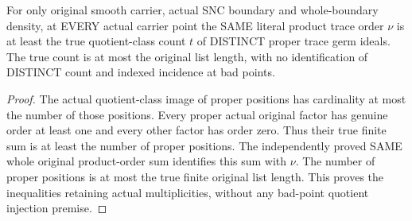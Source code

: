 \begin{theorem}
\label{hir:sharp-original-product-order-ge-distinct-proper-count-all-points}
\leanok
For only original smooth carrier, actual SNC boundary and whole-boundary density,
at EVERY actual carrier point the SAME literal product trace order $\nu$ is at
least the true quotient-class count $t$ of DISTINCT proper trace germ ideals.
The true count is at most the original list length, with no identification of
DISTINCT count and indexed incidence at bad points.
\end{theorem}
\begin{proof}
The actual quotient-class image of proper positions has cardinality at most
the number of those positions. Every proper actual original factor has genuine
order at least one and every other factor has order zero. Thus their true
finite sum is at least the number of proper positions. The independently
proved SAME whole original product-order sum identifies this sum with $\nu$.
The number of proper positions is at most the true finite original list length.
This proves the inequalities retaining actual multiplicities, without any
bad-point quotient injection premise.
\end{proof}

